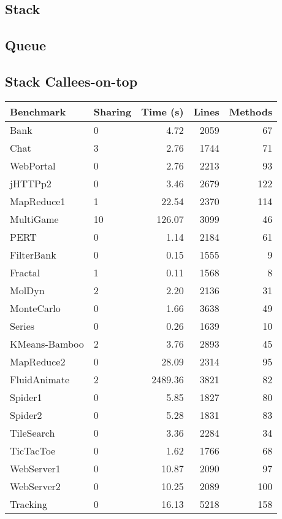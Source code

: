 \documentclass{amsart}[9pt]
\begin{document}
\subsection{Stack}


\subsection{Queue}



\subsection{Stack Callees-on-top}

\begin{tabular}{|l|l|r|r|r|}
\hline
Benchmark & Sharing & Time (s) & Lines & Methods \\
\hline
Bank          & 0  & 4.72    & 2059 & 67 \\
Chat          & 3  & 2.76    & 1744 & 71 \\
WebPortal     & 0  & 2.76    & 2213 & 93 \\
jHTTPp2       & 0  & 3.46    & 2679 & 122 \\
MapReduce1    & 1  & 22.54   & 2370 & 114 \\
MultiGame     & 10 & 126.07  & 3099 & 46 \\
PERT          & 0  & 1.14    & 2184 & 61 \\
FilterBank    & 0  & 0.15    & 1555 & 9 \\
Fractal       & 1  & 0.11    & 1568 & 8 \\
MolDyn        & 2  & 2.20    & 2136 & 31 \\
MonteCarlo    & 0  & 1.66    & 3638 & 49 \\
Series        & 0  & 0.26    & 1639 & 10 \\
KMeans-Bamboo & 2  & 3.76    & 2893 & 45 \\
MapReduce2    & 0  & 28.09   & 2314 & 95 \\
FluidAnimate  & 2  & 2489.36 & 3821 & 82 \\
Spider1       & 0  & 5.85    & 1827 & 80 \\
Spider2       & 0  & 5.28    & 1831 & 83 \\
TileSearch    & 0  & 3.36    & 2284 & 34 \\
TicTacToe     & 0  & 1.62    & 1766 & 68 \\
WebServer1    & 0  & 10.87   & 2090 & 97 \\
WebServer2    & 0  & 10.25   & 2089 & 100 \\
Tracking      & 0  & 16.13   & 5218 & 158 \\
\hline
\end{tabular}
\end{document}
